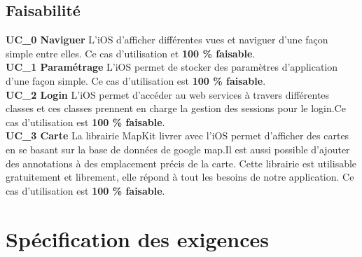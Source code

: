 	\subsection{Faisabilité}
		\textbf{UC\_0  Naviguer}  L'\gls{iOS} d'afficher différentes vues et naviguer d'une façon simple entre elles. Ce cas d'utilisation et \textbf{100 \%  faisable}.\\[0.2cm]
		\textbf{UC\_1  Paramétrage}  L'\gls{iOS} permet de stocker des paramètres d'application d'une façon simple. Ce cas d'utilisation est \textbf{100 \%  faisable}.\\[0.2cm]
		\textbf{UC\_2  Login}  L'\gls{iOS} permet d'accéder au web services à travers différentes classes et ces classes prennent en charge la gestion des sessions pour le login.Ce cas d'utilisation est \textbf{100 \%  faisable}.\\[0.2cm]
		\textbf{UC\_3  Carte}  La librairie MapKit livrer avec l'\gls{iOS} permet d'afficher des cartes en se basant sur la base de données de google map.Il est aussi possible d'ajouter des annotations à des emplacement précis de la carte. Cette librairie est utilisable gratuitement et librement, elle répond à tout les besoins de notre application. Ce cas d'utilisation est \textbf{100 \%  faisable}.\\[0.2cm]
\section{Spécification des exigences }
